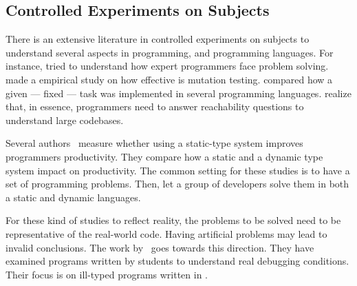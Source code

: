 \subsection*{Controlled Experiments on Subjects }
There is an extensive literature \perse{} in controlled experiments on subjects to understand several aspects in programming, and programming languages.
For instance, \cite{solowayEmpiricalStudiesProgramming1984} tried to understand how expert programmers face problem solving.
\cite{buddTheoreticalEmpiricalStudies1980} made a empirical study on how effective is mutation testing.
\cite{precheltEmpiricalComparisonSeven2000} compared how a given --- fixed --- task was implemented in several programming languages.
%
\cite{latozaDevelopersAskReachability2010} realize that, in essence, programmers need to answer reachability questions to understand large codebases.

Several authors~\cite{stuchlikStaticVsDynamic2011,mayerEmpiricalStudyInfluence2012,harlinImpactUsingStaticType2017} measure whether using a static-type system improves programmers productivity.
They compare how a static and a dynamic type system impact on productivity.
The common setting for these studies is to have a set of programming problems.
Then, let a group of developers solve them in both a static and dynamic languages.

For these kind of studies to reflect reality, the problems to be solved need to be representative of the real-world code.
Having artificial problems may lead to invalid conclusions.
The work by~\cite{wuHowTypeErrors2017,wuLearningUserFriendly2017} goes towards this direction. 
They have examined programs written by students to understand real debugging conditions. 
Their focus is on ill-typed programs written in \haskell{}.

